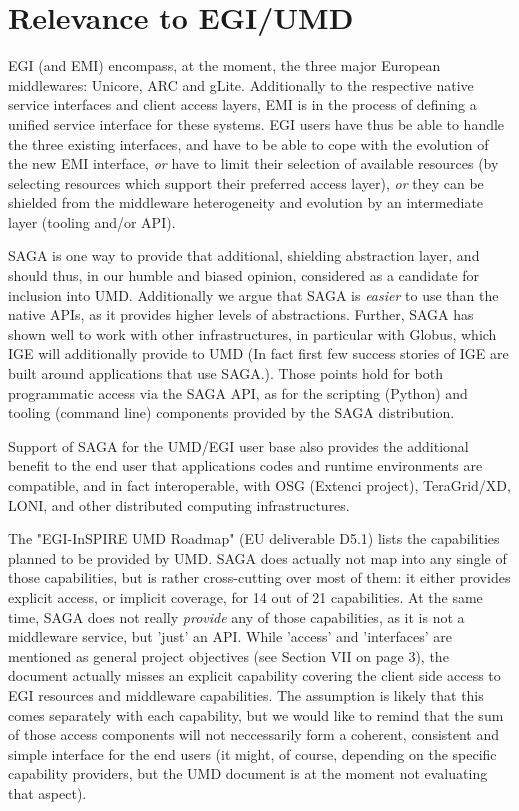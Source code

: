 \documentclass[12pt]{article}
\newcommand{\I}[1]{\textit{#1}}
\begin{document}

\section{Relevance to EGI/UMD}

EGI (and EMI) encompass, at the moment, the three major European
middlewares: Unicore, ARC and gLite.  Additionally to the respective
native service interfaces and client access layers, EMI is in the
process of defining a unified service interface for these systems.
EGI users have thus be able to handle the three existing interfaces,
and have to be able to cope with the evolution of the new EMI
interface, \I{or} have to limit their selection of available resources
(by selecting resources which support their preferred access layer),
\I{or} they can be shielded from the middleware heterogeneity and
evolution by an intermediate layer (tooling and/or API).
 
SAGA is one way to provide that additional, shielding abstraction
layer, and should thus, in our humble and biased opinion, considered
as a candidate for inclusion into UMD.  Additionally we argue that
SAGA is \I{easier} to use than the native APIs, as it provides higher
levels of abstractions.  Further, SAGA has shown well to work with
other infrastructures, in particular with Globus, which IGE will
additionally provide to UMD (In fact first few success stories of IGE
are built around applications that use SAGA.).  Those points hold for
both programmatic access via the SAGA API, as for the scripting
(Python) and tooling (command line) components provided by the SAGA
distribution.

Support of SAGA for the UMD/EGI user base also provides the additional
benefit to the end user that applications codes and runtime
environments are compatible, and in fact interoperable, with OSG
(Extenci project), TeraGrid/XD, LONI, and other distributed computing
infrastructures.

The "EGI-InSPIRE UMD Roadmap" (EU deliverable D5.1) lists the
capabilities planned to be provided by UMD.  SAGA does actually not
map into any single of those capabilities, but is rather cross-cutting
over most of them: it either provides explicit access, or implicit
coverage, for 14 out of 21 capabilities.  At the same time, SAGA does
not really \I{provide} any of those capabilities, as it is not a
middleware service, but 'just' an API.  While 'access' and
'interfaces' are mentioned as general project objectives (see Section
VII on page 3), the document actually misses an explicit capability
covering the client side access to EGI resources and middleware
capabilities.  The assumption is likely that this comes separately
with each capability, but we would like to remind that the sum of
those access components will not neccessarily form a coherent,
consistent and simple interface for the end users (it might, of
course, depending on the specific capability providers, but the UMD
document is at the moment not evaluating that aspect).
\end{document}
